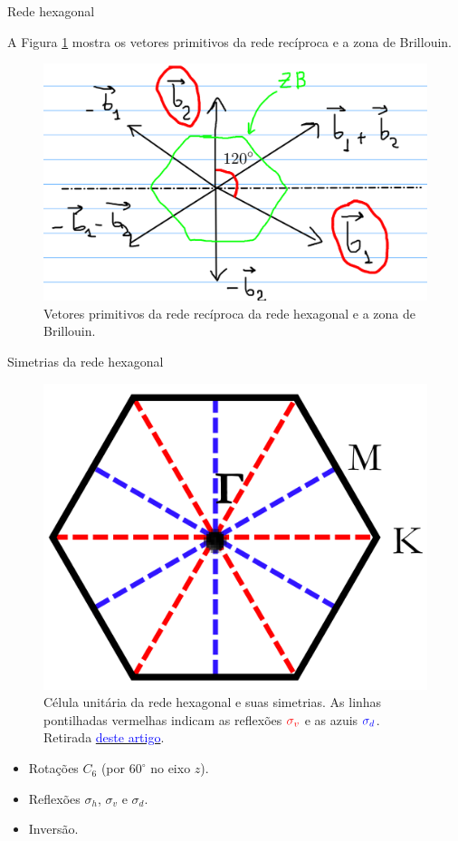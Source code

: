 \documentclass[aspectratio=169]{beamer}
\begin{document}


\begin{frame}{Rede hexagonal}

A Figura \ref{fig:hex_bz} mostra os vetores primitivos da rede recíproca e a zona de Brillouin.

\begin{figure}[H]
\centering
\includegraphics[width=0.65\linewidth]{fig/hex_bz}
\caption{Vetores primitivos da rede recíproca da rede hexagonal e a zona de Brillouin.}
\label{fig:hex_bz}
\end{figure}

\end{frame}




\begin{frame}{Simetrias da rede hexagonal}

\begin{figure}[H]
\centering
\includegraphics[width=0.3\linewidth]{fig/symm_hexago.png}
\caption{Célula unitária da rede hexagonal e suas simetrias. As linhas pontilhadas vermelhas indicam as reflexões $\textcolor{red}{\sigma_v}$ e as azuis $\textcolor{blue}{\sigma_d}$. Retirada \href{https://www.mdpi.com/2073-8994/5/4/344}{\textcolor{blue}{deste artigo}}.}
\label{fig:symm_hexago}
\end{figure}

\begin{itemize}
\item Rotações $C_6$ (por $60^\circ$ no eixo $z$).
\item Reflexões $\sigma_h$, $\sigma_v$ e $\sigma_d$.
\item Inversão.
\end{itemize}

\end{frame}
\end{document}
